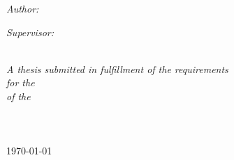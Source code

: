 \documentclass[
11pt, %
oneside, %
english, %
singlespacing, %
liststotoc, %
]{MastersDoctoralThesis} %
\begin{document}
\begin{titlepage}
\begin{center}
\begin{minipage}[t]{0.4\textwidth}
\begin{flushleft} \large
\emph{Author:}\\
{\authorname} %
\end{flushleft}
\end{minipage}
\begin{minipage}[t]{0.4\textwidth}
\begin{flushright} \large
\emph{Supervisor:} \\
{\supname} %
\end{flushright}
\end{minipage}\\[2cm]
 

\large \textit{A thesis submitted in fulfillment of the requirements\\ for the \degreename}\\[0.3cm] %
\textit{of the}\\[0.4cm]
\groupname\\ \facname\\ \deptname\\[1.5cm] %

\today


 
\end{center}
\end{titlepage}

\end{document}
